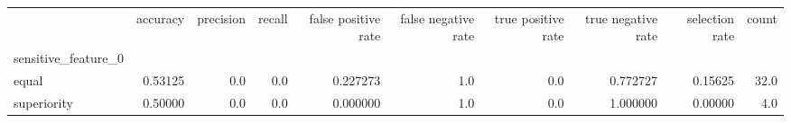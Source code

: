 \begin{tabular}{lrrrrrrrrr}
\toprule
{} &  accuracy &  precision &  recall &  false positive rate &  false negative rate &  true positive rate &  true negative rate &  selection rate &  count \\
sensitive\_feature\_0 &           &            &         &                      &                      &                     &                     &                 &        \\
\midrule
equal               &   0.53125 &        0.0 &     0.0 &             0.227273 &                  1.0 &                 0.0 &            0.772727 &         0.15625 &   32.0 \\
superiority         &   0.50000 &        0.0 &     0.0 &             0.000000 &                  1.0 &                 0.0 &            1.000000 &         0.00000 &    4.0 \\
\bottomrule
\end{tabular}
